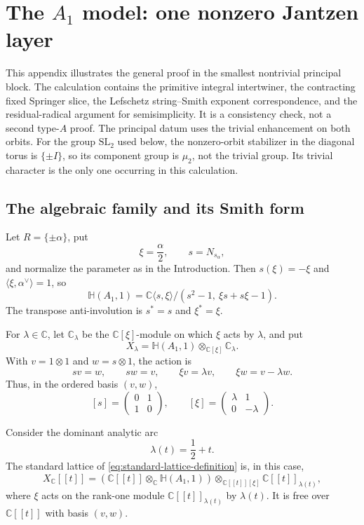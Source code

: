 \documentclass[10pt,a4paper]{amsart}
\newcommand{\Hh}{\mathbb H}
\newcommand{\C}{\mathbb C}
\newcommand{\A}{\C[[t]]}
\begin{document}
\renewcommand{\theequation}{B.\arabic{equation}}
\setcounter{equation}{0}
\section{The \texorpdfstring{$A_1$}{A1} model: one nonzero Jantzen layer}
\label{app:rank-one}

This appendix illustrates the general proof in the smallest nontrivial
principal block.  The calculation contains the primitive integral
intertwiner, the contracting fixed Springer slice, the Lefschetz
string--Smith exponent correspondence, and the residual-radical argument
for semisimplicity.  It is a consistency check, not a second type-$A$ proof.
The principal datum uses the trivial enhancement on both orbits.
For the group $\mathrm{SL}_2$ used below, the nonzero-orbit stabilizer
in the diagonal torus is $\{\pm I\}$, so its component group is
$\mu_2$, not the trivial group.  Its trivial character is the only one
occurring in this calculation.

\subsection{The algebraic family and its Smith form}

Let $R=\{\pm\alpha\}$, put
\[
 \xi=\frac{\alpha}{2},\qquad s=N_{s_\alpha},
\]
and normalize the parameter as in the Introduction.  Then
$s(\xi)=-\xi$ and $\langle\xi,\alpha^\vee\rangle=1$, so
\[
 \Hh(A_1,1)
 =\mathbb C\langle s,\xi\rangle/
   (s^2-1,\ \xi s+s\xi-1).
\]
The transpose anti-involution is $s^*=s$ and $\xi^*=\xi$.

For $\lambda\in\mathbb C$, let $\mathbb C_\lambda$ be the
$\mathbb C[\xi]$-module on which $\xi$ acts by $\lambda$, and put
\[
 X_\lambda=\Hh(A_1,1)\otimes_{\mathbb C[\xi]}\mathbb C_\lambda.
\]
With $v=1\otimes1$ and $w=s\otimes1$, the action is
\[
 sv=w,\qquad sw=v,\qquad
 \xi v=\lambda v,\qquad \xi w=v-\lambda w.
\]
Thus, in the ordered basis $(v,w)$,
\begin{equation}\label{eq:A1-action}
 [s]=\begin{pmatrix}0&1\\1&0\end{pmatrix},
 \qquad
 [\xi]=\begin{pmatrix}\lambda&1\\0&-\lambda\end{pmatrix}.
\end{equation}

Consider the dominant analytic arc
\[
 \lambda(t)=\frac12+t.
\]
The standard lattice of \eqref{eq:standard-lattice-definition} is, in this
case,
\[
 X_\A=
 (\A\otimes_{\mathbb C}\Hh(A_1,1))
 \otimes_{\A[\xi]}\A_{\lambda(t)},
\]
where $\xi$ acts on the rank-one module $\A_{\lambda(t)}$ by
$\lambda(t)$.  It is free over $\A$ with basis $(v,w)$.
\end{document}

